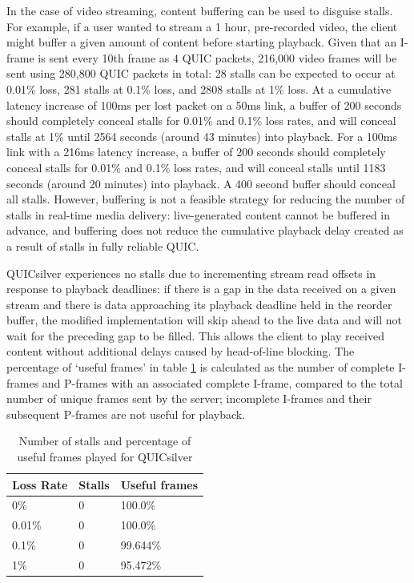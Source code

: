 \documentclass{mpaper}
\begin{document}
In the case of video streaming, content buffering can be used to disguise stalls. For example, if a user wanted to stream a 1 hour, pre-recorded video, the client might buffer a given amount of content before starting playback. Given that an I-frame is sent every 10th frame as 4 QUIC packets, 216,000 video frames will be sent using 280,800 QUIC packets in total: 28 stalls can be expected to occur at 0.01\% loss, 281 stalls at 0.1\% loss, and 2808 stalls at 1\% loss. At a cumulative latency increase of 100ms per lost packet on a 50ms link, a buffer of 200 seconds should completely conceal stalls for 0.01\% and 0.1\% loss rates, and will conceal stalls at 1\% until 2564 seconds (around 43 minutes) into playback. For a 100ms link with a 216ms latency increase, a buffer of 200 seconds should completely conceal stalls for 0.01\% and 0.1\% loss rates, and will conceal stalls until 1183 seconds (around 20 minutes) into playback. A 400 second buffer should conceal all stalls. However, buffering is not a feasible strategy for reducing the number of stalls in real-time media delivery: live-generated content cannot be buffered in advance, and buffering does not reduce the cumulative playback delay created as a result of stalls in fully reliable QUIC.


QUICsilver experiences no stalls due to incrementing stream read offsets in response to playback deadlines: if there is a gap in the data received on a given stream and there is data approaching its playback deadline held in the reorder buffer, the modified implementation will skip ahead to the live data and will not wait for the preceding gap to be filled. This allows the client to play received content without additional delays caused by head-of-line blocking. The percentage of `useful frames' in table \ref{par-playback-stats} is calculated as the number of complete I-frames and P-frames with an associated complete I-frame, compared to the total number of unique frames sent by the server; incomplete I-frames and their subsequent P-frames are not useful for playback.

\begin{table}[h!]
\centering
\label{stalls-data-par}
\begin{center}
\begin{tabular}{|p{2cm}|p{2cm}|p{2cm}|}
\hline
Loss Rate & Stalls & Useful frames\\ \hline
0\% & 0 & 100.0\% \\ \hline
0.01\%  & 0 & 100.0\% \\ \hline
0.1\%  & 0 & 99.644\% \\ \hline
1\%  & 0 & 95.472\% \\ \hline

\end{tabular}
\caption{Number of stalls and percentage of useful frames played for QUICsilver}
\label{par-playback-stats}
\end{center}
\end{table}
\end{document}
